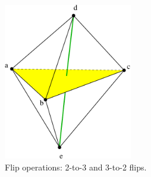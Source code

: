 \begin{figure}
  \centering
  \includegraphics[width=0.5\textwidth]{../figs/flip-cosph5-2tets}
\caption{Flip operations: 2-to-3 and 3-to-2 flips.}
\label{fig:flip23}
\end{figure}


